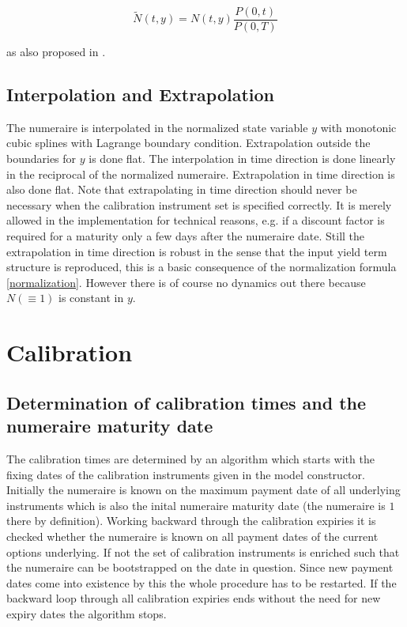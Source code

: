 \documentclass{amsart}
\theoremstyle{plain}
\numberwithin{equation}{section}
\begin{document}
\begin{equation}\label{normalization}
\tilde{N}(t,y) = N(t,y) \frac{P(0,t)}{P(0,T)}
\end{equation}

as also proposed in \cite{Johnson}.

\subsection{Interpolation and Extrapolation}

The numeraire is interpolated in the normalized state variable $y$ with monotonic cubic splines with Lagrange boundary condition. Extrapolation outside the boundaries for $y$ is done flat. The interpolation in time direction is done linearly in the reciprocal of the normalized numeraire. Extrapolation in time direction is also done flat. Note that extrapolating in time direction should never be necessary when the calibration instrument set is specified correctly. It is merely allowed in the implementation for technical reasons, e.g. if a discount factor is required for a maturity only a few days after the numeraire date.
Still the extrapolation in time direction is robust in the sense that the input yield term structure is reproduced, this is a basic consequence of the normalization formula \ref{normalization}. However there is of course no dynamics out there because $N(\equiv1)$ is constant in $y$.

\section{Calibration}

\subsection{Determination of calibration times and the numeraire maturity date}

The calibration times are determined by an algorithm which starts with the fixing dates of the calibration instruments given in the model constructor. Initially the numeraire is known on the maximum payment date of all underlying instruments which is also the inital numeraire maturity date (the numeraire is $1$ there by definition). Working backward through the calibration expiries it is checked whether the numeraire is known on all payment dates  of the current options underlying. If not the set of calibration instruments is enriched such that the numeraire can be bootstrapped on the date in question. Since new payment dates come into existence by this the whole procedure has to be restarted. If the backward loop through all calibration expiries ends without the need for new expiry dates the algorithm stops.
\end{document}
